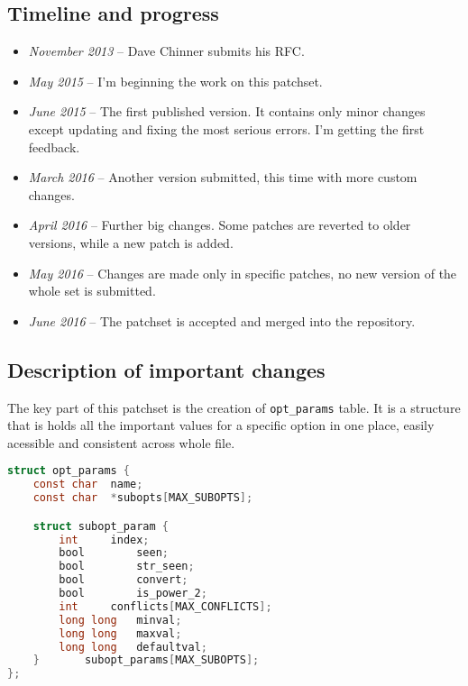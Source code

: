 \subsection{Timeline and progress}

\begin{itemize}
	\item {\em November 2013} -- Dave Chinner submits his RFC.
	\item {\em May 2015} -- I'm beginning the work on this patchset.
	\item {\em June 2015} -- The first published version. It contains
		only minor changes except updating and fixing the most
		serious errors. I'm getting the first feedback.
	\item {\em March 2016} -- Another version submitted, this time with
		more custom changes.
	\item {\em April 2016} -- Further big changes. Some patches are
		reverted to older versions, while a new patch is added.
	\item {\em May 2016} -- Changes are made only in specific patches,
		no new version of the whole set is submitted.
	\item {\em June 2016} -- The patchset is accepted and merged into
		the repository.
\end{itemize}

\subsection{Description of important changes}

The key part of this patchset is the creation of {\tt opt\_params} table.
It is a structure that is holds all the important values for a specific
option in one place, easily acessible and consistent across whole file.

\begin{lstlisting}[frame=none, basicstyle=\footnotesize\ttfamily,
language=C, numbers=none, numberstyle=\tiny\color{black},
caption= {Definition of the table.}]
struct opt_params {
	const char	name;
	const char	*subopts[MAX_SUBOPTS];

	struct subopt_param {
		int		index;
		bool		seen;
		bool		str_seen;
		bool		convert;
		bool		is_power_2;
		int		conflicts[MAX_CONFLICTS];
		long long	minval;
		long long	maxval;
		long long	defaultval;
	}		subopt_params[MAX_SUBOPTS];
};
\end{lstlisting}

